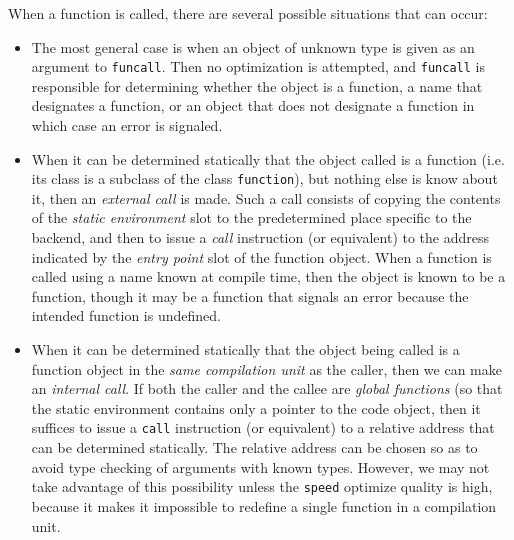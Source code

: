 When a function is called, there are several possible situations that
can occur:

\begin{itemize}
\item The most general case is when an object of unknown type is given
  as an argument to \texttt{funcall}.  Then no optimization is
  attempted, and \texttt{funcall} is responsible for determining
  whether the object is a function, a name that designates a function,
  or an object that does not designate a function in which case an error is
  signaled.
\item When it can be determined statically that the object called is a
  function (i.e. its class is a subclass of the class
  \texttt{function}), but nothing else is know about it, then an
  \emph{external call} is made.  Such a call consists of copying the
  contents of the \emph{static environment} slot to the predetermined
  place specific to the backend, and then to issue a \emph{call}
  instruction (or equivalent) to the address indicated by the
  \emph{entry point} slot of the function object.  When a function is
  called using a name known at compile time, then the object is known
  to be a function, though it may be a function that signals an error
  because the intended function is undefined.
\item When it can be determined statically that the object being
  called is a function object in the \emph{same compilation unit} as
  the caller, then we can make an \emph{internal call}.  If both the
  caller and the callee are \emph{global functions} (so that the
  static environment contains only a pointer to the code object, then
  it suffices to issue a \texttt{call} instruction (or equivalent) to
  a relative address that can be determined statically. The relative
  address can be chosen so as to avoid type checking of arguments with
  known types.  However, we may not take advantage of this possibility
  unless the \texttt{speed} optimize quality is high, because it makes
  it impossible to redefine a single function in a compilation unit.
\end{itemize}

